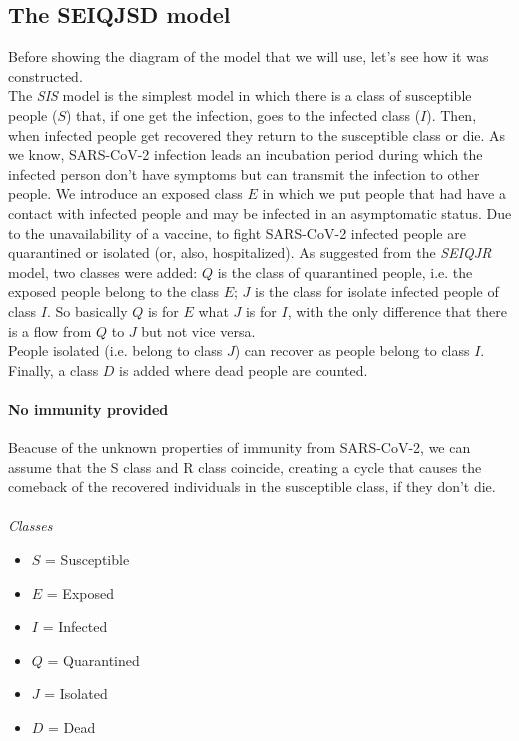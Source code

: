 \documentclass[12pt]{llncs}
\begin{document}
\subsection{The SEIQJSD model}
Before showing the diagram of the model that we will use, let's see how it was constructed.\\
The \textit{SIS} model is the simplest model in which there is a class of susceptible people ($S$) that, if one get the infection, goes to the infected class ($I$). Then, when infected people get recovered they return to the susceptible class or die.
As we know, SARS-CoV-2 infection leads an incubation period during which the infected person don't have symptoms but can transmit the infection to other people. We introduce an exposed class $E$ in which we put people that had have a contact with infected people and may be infected in an asymptomatic status.
Due to the unavailability of a vaccine, to fight SARS-CoV-2 infected people are quarantined or isolated (or, also, hospitalized). As suggested from the \textit{SEIQJR} model, two classes were added: $Q$ is the class of quarantined people, i.e. the exposed people belong to the class $E$; $J$ is the class for isolate infected people of class $I$. So basically $Q$ is for $E$ what $J$ is for $I$, with the only difference that there is a flow from $Q$ to $J$ but not vice versa.\\
People isolated (i.e. belong to class $J$) can recover as people belong to class $I$. Finally, a class $D$ is added where dead people are counted.

\paragraph{\textbf{No immunity provided}}
Beacuse of the unknown properties of immunity from SARS-CoV-2, we can assume that the S class and R class coincide, creating a cycle that causes the comeback of the recovered individuals in the susceptible class, if they don't die.
\\\\
\textit{Classes}
\begin{multicols}{3}
\begin{itemize}
\item $S$ = Susceptible
\item $E$ = Exposed
\item $I$ = Infected
\item $Q$ = Quarantined
\item $J$ = Isolated
\item $D$ = Dead
\end{itemize}
\end{multicols}
\end{document}
